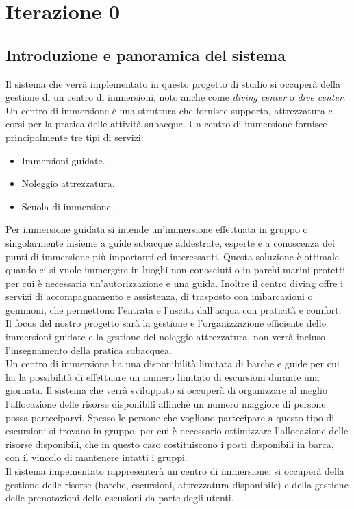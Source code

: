 \chapter{Iterazione 0}
\section{Introduzione e panoramica del sistema}
Il sistema che verrà implementato in questo progetto di studio si occuperà della gestione di un centro di immersioni, noto anche come \emph{diving center} o \emph{dive center}. Un centro di immersione è una struttura che fornisce supporto, attrezzatura e corsi per la pratica delle attività subacque. Un centro di immersione fornisce principalmente tre tipi di servizi: 
\begin{itemize}
\item Immersioni guidate.
\item Noleggio attrezzatura.
\item Scuola di immersione. 
\end{itemize}
Per immersione guidata si intende un'immersione effettuata in gruppo o singolarmente insieme a guide subacque addestrate, esperte e a conoscenza dei punti di immersione più importanti ed interessanti. Questa soluzione è ottimale quando ci si vuole immergere in luoghi non conosciuti o in parchi marini protetti per cui è necessaria un'autorizzazione e una guida. Inoltre il centro diving offre i servizi di accompagnamento e assistenza, di trasposto con imbarcazioni o gommoni, che permettono l'entrata e l'uscita dall'acqua con praticità e comfort. 
\\
Il focus del nostro progetto sarà la gestione e l'organizzazione efficiente delle immersioni guidate e la gestione del noleggio attrezzatura, non verrà incluso l'insegnamento della pratica subacquea. 
\\
Un centro di immersione ha una disponibilità limitata di barche e guide per cui ha la possibilità di effettuare un numero limitato di escursioni durante una giornata. Il sistema che verrà sviluppato si occuperà di organizzare al meglio l'allocazione delle risorse disponibili affinchè un numero maggiore di persone possa parteciparvi. Spesso  le persone che vogliono partecipare a questo tipo di escursioni si trovano in gruppo, per cui è necessario ottimizzare l'allocazione delle risorse disponibili, che in questo caso costituiscono i posti disponibili in barca, con il vincolo di mantenere intatti i gruppi. 
\\
Il sistema impementato rappresenterà un centro di immersione: si occuperà della gestione delle risorse (barche, escursioni, attrezzatura disponibile) e della gestione delle prenotazioni delle escusioni da parte degli utenti.  
